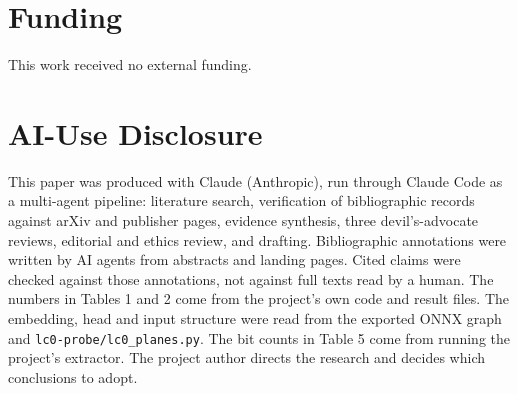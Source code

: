 \documentclass[conference]{IEEEtran}
\begin{document}
\section*{Funding}
This work received no external funding.

\section*{AI-Use Disclosure}
This paper was produced with Claude (Anthropic), run through Claude Code as a multi-agent pipeline: literature search, verification of bibliographic records against arXiv and publisher pages, evidence synthesis, three devil's-advocate reviews, editorial and ethics review, and drafting. Bibliographic annotations were written by AI agents from abstracts and landing pages. Cited claims were checked against those annotations, not against full texts read by a human. The numbers in Tables 1 and 2 come from the project's own code and result files. The embedding, head and input structure were read from the exported ONNX graph and \texttt{lc0-\allowbreak{}probe/\allowbreak{}lc0\_\allowbreak{}planes.\allowbreak{}py}. The bit counts in Table 5 come from running the project's extractor. The project author directs the research and decides which conclusions to adopt.



\end{document}
